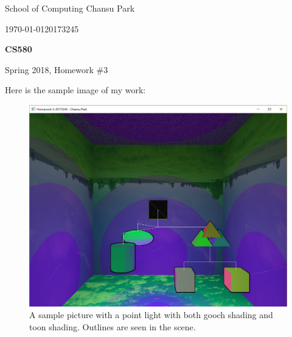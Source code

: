 \documentclass[11pt]{article}
\begin{document}
 



{\large
\noindent School of Computing %
\hfill Chansu Park %

\vspace{.1in}

\noindent \today \hfill 20173245}

\vspace{.25in}

\Large{
\begin{center}
\textbf{CS580}

Spring 2018, Homework \#3
\end{center}
}

\large

Here is the sample image of my work:
\begin{figure}[htb]
	\begin{center}
		\includegraphics[width=0.8\linewidth]{gooch.png}
	\end{center}
	\caption{A sample picture with a point light with both gooch shading and toon shading. Outlines are seen in the scene.}
\end{figure}
\end{document}
